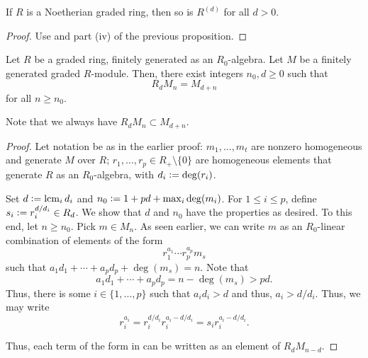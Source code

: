 \documentclass[12pt]{article}
\begin{document}
\begin{cor}
	If $R$ is a Noetherian graded ring, then so is $R^{(d)}$ for all $d > 0$.
\end{cor}
\begin{proof} 
	Use  and part (iv) of the previous proposition.
\end{proof}

\begin{prop} \label{prop:n-d-stabilise}
	Let $R$ be a graded ring, finitely generated as an $R_{0}$-algebra. Let $M$ be a finitely generated graded $R$-module. \newline
	Then, there exist integers $n_{0}, d \ge 0$ such that
	\begin{equation*} 
		R_{d} M_{n} = M_{d + n}
	\end{equation*}
	for all $n \ge n_{0}$.
\end{prop}
Note that we always have $R_{d} M_{n} \subset M_{d + n}$. 
\begin{proof} 
	Let notation be as in the earlier proof: $m_{1}, \ldots, m_{t}$ are nonzero homogeneous and generate $M$ over $R$; $r_{1}, \ldots, r_{p} \in R_{+} \setminus \{0\}$ are homogeneous elements that generate $R$ as an $R_{0}$-algebra, with $d_{i} \vcentcolon= \deg(r_{i})$.

	Set $d \vcentcolon= \operatorname*{lcm}_{i} d_{i}$ and $n_{0} \vcentcolon= 1 + pd + \max_{i} \deg(m_{i})$. For $1 \le i \le p$, define $s_{i} \vcentcolon= r_{i}^{d/d_{i}} \in R_{d}$. \newline
	We show that $d$ and $n_{0}$ have the properties as desired. To this end, let $n \ge n_{0}$. Pick $m \in M_{n}$. As seen earlier, we can write $m$ as an $R_{0}$-linear combination of elements of the form
	\begin{equation} \label{eq:002}
		r_{1}^{a_{1}} \cdots r_{p}^{a_{p}} m_{s}
	\end{equation}
	such that $a_{1} d_{1} + \cdots + a_{p} d_{p} + \deg(m_{s}) = n$. Note that
	\begin{equation*} 
		a_{1} d_{1} + \cdots + a_{p} d_{p} = n - \deg(m_{s}) > pd.
	\end{equation*}
	Thus, there is some $i \in \{1, \ldots, p\}$ such that $a_{i} d_{i} > d$ and thus, $a_{i} > d/d_{i}$. Thus, we may write
	\begin{equation*} 
		r_{i}^{a_{i}} = r_{i}^{d/d_{i}} r_{i}^{a_{i} - d/d_{i}} = s_{i} r_{i}^{a_{i} - d/d_{i}}.
	\end{equation*}

	Thus, each term of the form in  can be written as an element of $R_{d} M_{n - d}$.
\end{proof}
\end{document}

